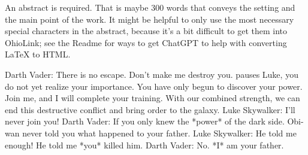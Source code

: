 
An abstract is required.
That is maybe 300 words that conveys the setting and the main point of the work.
It might be helpful to only use the most necessary special characters in the abstract, because it's a bit difficult to get them into OhioLink; see the Readme for ways to get ChatGPT to help with converting LaTeX to HTML.

Darth Vader:
	There is no escape. Don't make me destroy you.
	pauses Luke, you do not yet realize your importance.
	You have only begun to discover your power. Join me,
	and I will complete your training. With our combined
	strength, we can end this destructive conflict and
	bring order to the galaxy.
Luke Skywalker:
	I'll never join you!
Darth Vader:
	If you only knew the *power* of the dark side. Obi-wan
	never told you what happened to your father.
Luke Skywalker:
	He told me enough! He told me *you* killed him.
Darth Vader:
	No. *I* am your father.













